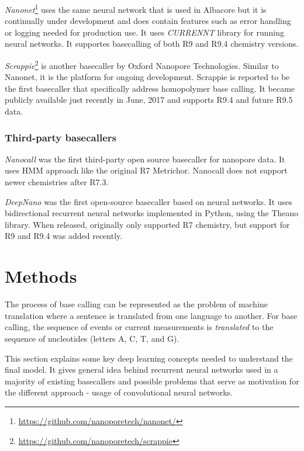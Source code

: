 \documentclass[times, utf8, diplomski, numeric, english]{fer}
\begin{document}
\textit{Nanonet}\footnote{\url{https://github.com/nanoporetech/nanonet/}} uses the same neural network that is used in Albacore but it is continually under development and does contain features such as error handling or logging needed for production use. It uses \textit{CURRENNT} library for running neural networks. It supportes basecalling of both R9 and R9.4 chemistry versions.


\textit{Scrappie}\footnote{\url{https://github.com/nanoporetech/scrappie}} is another basecaller by Oxford Nanopore Technologies. Similar to Nanonet, it is the platform for ongoing development. Scrappie is reported to be the first basecaller  that specifically address homopolymer base calling. It became publicly available just recently in June, 2017 and supports R9.4 and future R9.5 data.

\pagebreak
\subsection{Third-party basecallers}

\textit{Nanocall} \cite{David046086} was the first third-party open source basecaller for nanopore data. It uses HMM approach like the original R7 Metrichor. Nanocall does not support newer chemistries after R7.3.


\textit{DeepNano} \cite{Boza2017}  was the first open-source basecaller based on neural networks. It uses bidirectional recurrent neural networks implemented in Python, using the Theano library. When released, originally only supported R7 chemistry, but support for R9 and R9.4 was added recently.



\chapter{Methods}
The process of base calling can be represented as the problem of machine translation where a sentence is translated from one language to another. For base calling, the sequence of events or current measurements is \textit{translated} to the sequence of nucleotides (letters A, C, T, and G).

This section explains some key  deep learning concepts needed to understand the final model. It gives general idea behind recurrent neural networks used in a majority of existing basecallers and possible problems that serve as motivation for the different approach - usage of convolutional neural networks. 
\end{document}

